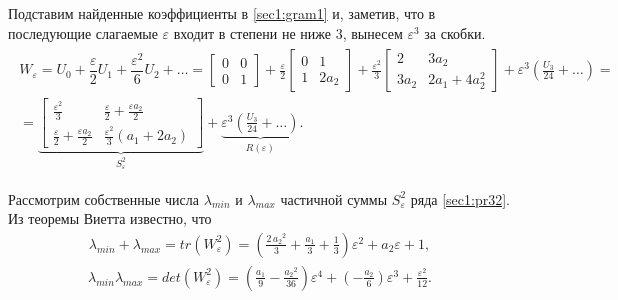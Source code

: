 \documentclass[../main.tex]{subfiles}
\begin{document}
Подставим найденные коэффициенты в \eqref{sec1:gram1} и, заметив, что в последующие слагаемые $ \varepsilon $ входит в степени не ниже $ 3 $, вынесем $ \varepsilon^3 $ за скобки.
\begin{gather}\label{sec1:pr32}
\begin{gathered}
         W_{\varepsilon} = U_0 + \dfrac{\varepsilon}{2} U_1 + \dfrac{\varepsilon^2}{6}U_2 + \dots = \left[ {\begin{array}{*{20}{c}}
                 0&0\\
                 0&1
         \end{array}}\right] +\frac{\varepsilon}{2} \left[ {\begin{array}{*{20}{c}}
                 0&1\\
                 1&2a_2
         \end{array}}\right] +\frac{\varepsilon^2}{3} \left[ {\begin{array}{*{20}{c}}
                 2&3a_2\\
                 3a_2&2a_1+4a_2^2
         \end{array}}\right] + \varepsilon^3 \left( \frac{U_3}{24} + \dots \right) =
         \\
         = \underbrace{\left[ \begin{array}{*{20}{c}}
                 \frac{\varepsilon^2}{3} & \frac{\varepsilon}{2} + \frac{\varepsilon a_2}{2} \\ 
                 \frac{\varepsilon}{2} + \frac{\varepsilon a_2}{2} & \frac{\varepsilon^2}{3}(a_1+2a_2) 
             \end{array} \right]}_{S_{\varepsilon}^{2}} + \underbrace{ \varepsilon^3 \left( \frac{U_3}{24} + \dots \right)}_{R(\varepsilon)}.
\end{gathered}
\end{gather}
 
 
Рассмотрим собственные числа $ \lambda_{min} $ и $ \lambda_{max} $ частичной суммы $ S_{\varepsilon}^{2} $ ряда \eqref{sec1:pr32}.
Из теоремы Виетта известно, что 
\begin{gather}\label{sec1:lambdamax}
    \lambda_{min} + \lambda_{max} = tr(W_{\varepsilon}^{2}) = \left(\frac{2\,{a_{2}}^2}{3}+\frac{a_{1}}{3}+\frac{1}{3}\right)\varepsilon^2+a_{2}\varepsilon+1,
\end{gather}
\begin{gather}\label{sec1:lambdamin}
     \lambda_{min}  \lambda_{max} = det(W_{\varepsilon}^{2}) = \left(\frac{a_{1}}{9}-\frac{{a_{2}}^2}{36}\right)\varepsilon^4+\left(-\frac{a_{2}}{6}\right)\varepsilon^3+\frac{\varepsilon^2}{12}.
\end{gather}
 
\end{document}

